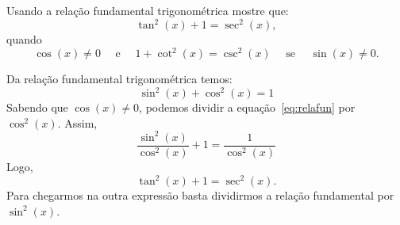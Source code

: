 \begin{example}
  Usando a relação fundamental trigonométrica mostre que:
  \[
    \tan^2(x)+1 = \sec^2(x),
  \]
  quando
  \[
    \cos(x) \neq 0
    \quad\text{ e }\quad
    1+ \cot^2(x) = \csc^2(x)
    \quad\text{ se }\quad
    \sin(x) \neq 0.
  \]

  \solution
  Da relação fundamental trigonométrica temos:
  \begin{equation} \label{eq:relafun}
    \sin^2(x)+\cos^2(x)=1
  \end{equation}
  Sabendo que $\cos(x) \neq 0$, podemos dividir a equação~\eqref{eq:relafun}
  por $\cos^2(x)$. Assim,
  \[
    \frac{\sin^2(x)}{\cos^2(x)}+ 1= \frac{1}{\cos^2(x)}
  \]
  Logo,
  \[
    \tan^2(x)+1=\sec^2(x).
  \]
  Para chegarmos na outra expressão basta dividirmos a relação fundamental por
  $\sin^2(x)$.
\end{example}
